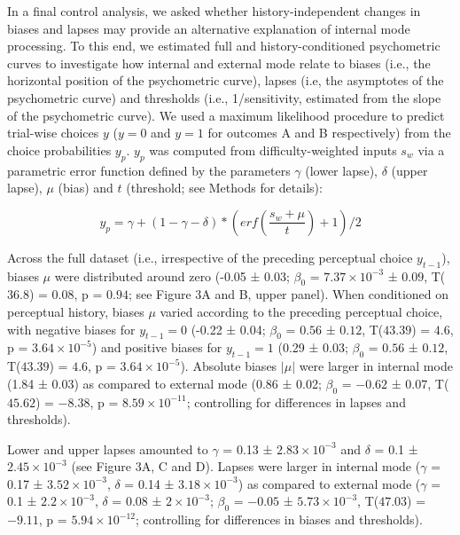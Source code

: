 \documentclass[
]{article}
\begin{document}
In a final control analysis, we asked whether history-independent
changes in biases and lapses may provide an alternative explanation of
internal mode processing. To this end, we estimated full and
history-conditioned psychometric curves to investigate how internal and
external mode relate to biases (i.e., the horizontal position of the
psychometric curve), lapses (i.e, the asymptotes of the psychometric
curve) and thresholds (i.e., 1/sensitivity, estimated from the slope of
the psychometric curve). We used a maximum likelihood procedure to
predict trial-wise choices \(y\) (\(y = 0\) and \(y = 1\) for outcomes A
and B respectively) from the choice probabilities \(y_p\). \(y_p\) was
computed from difficulty-weighted inputs \(s_w\) via a parametric error
function defined by the parameters \(\gamma\) (lower lapse), \(\delta\)
(upper lapse), \(\mu\) (bias) and \(t\) (threshold; see Methods for
details):

\begin{equation}
y_p = \gamma + (1 - \gamma - \delta) *  (erf(\frac{s_w + \mu}{t}) + 1) / 2
\end{equation}

Across the full dataset (i.e., irrespective of the preceding perceptual
choice \(y_{t-1}\)), biases \(\mu\) were distributed around zero (-0.05
± 0.03; \(\beta_0\) = \(\ensuremath{7.37\times 10^{-3}}\) ± \(0.09\),
T(\(36.8\)) = \(0.08\), p = \(0.94\); see Figure 3A and B, upper panel).
When conditioned on perceptual history, biases \(\mu\) varied according
to the preceding perceptual choice, with negative biases for
\(y_{t-1} = 0\) (-0.22 ± 0.04; \(\beta_0\) = \(0.56\) ± \(0.12\),
T(\(43.39\)) = \(4.6\), p = \(\ensuremath{3.64\times 10^{-5}}\)) and
positive biases for \(y_{t-1} = 1\) (0.29 ± 0.03; \(\beta_0\) = \(0.56\)
± \(0.12\), T(\(43.39\)) = \(4.6\), p =
\(\ensuremath{3.64\times 10^{-5}}\)). Absolute biases \(|\mu|\) were
larger in internal mode (1.84 ± 0.03) as compared to external mode (0.86
± 0.02; \(\beta_0\) = \(-0.62\) ± \(0.07\), T(\(45.62\)) = \(-8.38\), p
= \(\ensuremath{8.59\times 10^{-11}}\); controlling for differences in
lapses and thresholds).

Lower and upper lapses amounted to \(\gamma\) = 0.13 ±
\ensuremath{2.83\times 10^{-3}} and \(\delta\) = 0.1 ±
\ensuremath{2.45\times 10^{-3}} (see Figure 3A, C and D). Lapses were
larger in internal mode (\(\gamma\) = 0.17 ±
\ensuremath{3.52\times 10^{-3}}, \(\delta\) = 0.14 ±
\ensuremath{3.18\times 10^{-3}}) as compared to external mode
(\(\gamma\) = 0.1 ± \ensuremath{2.2\times 10^{-3}}, \(\delta\) = 0.08 ±
\ensuremath{2\times 10^{-3}}; \(\beta_0\) = \(-0.05\) ±
\(\ensuremath{5.73\times 10^{-3}}\), T(\(47.03\)) = \(-9.11\), p =
\(\ensuremath{5.94\times 10^{-12}}\); controlling for differences in
biases and thresholds).
\end{document}

